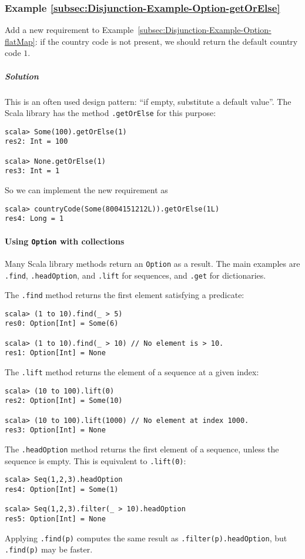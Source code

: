 \subsubsection{Example \label{subsec:Disjunction-Example-Option-getOrElse}\ref{subsec:Disjunction-Example-Option-getOrElse}}

Add a new requirement to Example~\ref{subsec:Disjunction-Example-Option-flatMap}:
if the country code is not present, we should return the default country
code $1$.

\subparagraph{Solution}

This is an often used design pattern: ``if empty, substitute a default
value''. The Scala library has the method \lstinline!.getOrElse!
for this purpose:
\begin{lstlisting}
scala> Some(100).getOrElse(1)
res2: Int = 100

scala> None.getOrElse(1)
res3: Int = 1
\end{lstlisting}
So we can implement the new requirement as
\begin{lstlisting}
scala> countryCode(Some(8004151212L)).getOrElse(1L)
res4: Long = 1
\end{lstlisting}


\paragraph{Using \texttt{Option} with collections}

Many Scala library methods return an \lstinline!Option! as a result.
The main examples are \lstinline!.find!, \lstinline!.headOption!,
and \lstinline!.lift! for sequences, and \lstinline!.get! for dictionaries.

The \lstinline!.find! method returns the first element satisfying
a predicate:
\begin{lstlisting}
scala> (1 to 10).find(_ > 5)
res0: Option[Int] = Some(6)

scala> (1 to 10).find(_ > 10) // No element is > 10.
res1: Option[Int] = None
\end{lstlisting}

The \lstinline!.lift! method returns the element of a sequence at
a given index:
\begin{lstlisting}
scala> (10 to 100).lift(0)
res2: Option[Int] = Some(10)

scala> (10 to 100).lift(1000) // No element at index 1000.
res3: Option[Int] = None
\end{lstlisting}

The \lstinline!.headOption! method returns the first element of a
sequence, unless the sequence is empty. This is equivalent to \lstinline!.lift(0)!:
\begin{lstlisting}
scala> Seq(1,2,3).headOption
res4: Option[Int] = Some(1)

scala> Seq(1,2,3).filter(_ > 10).headOption
res5: Option[Int] = None
\end{lstlisting}
Applying \lstinline!.find(p)! computes the same result as \lstinline!.filter(p).headOption!,
but \lstinline!.find(p)! may be faster.

